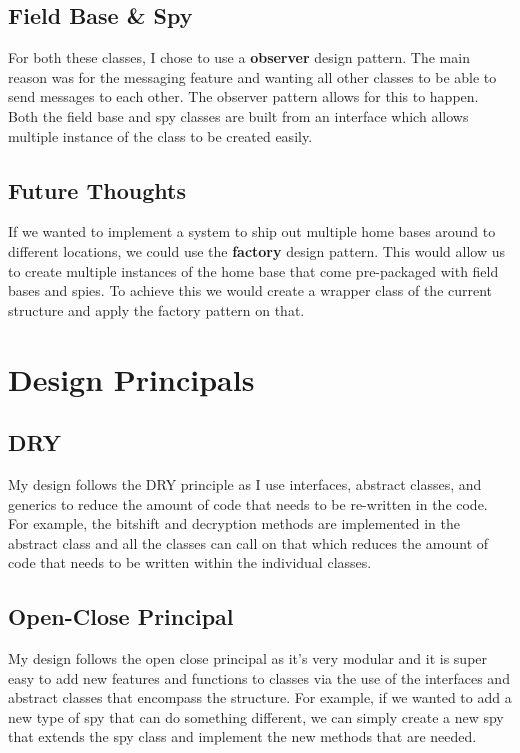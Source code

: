 \documentclass[12pt]{article}
\begin{document}
        \subsection*{Field Base \& Spy}
            For both these classes, I chose to use a \textbf{observer} design pattern. The main reason was for the messaging feature
            and wanting all other classes to be able to send messages to each other. The observer pattern allows
            for this to happen. Both the field base and spy classes are built from an interface which allows multiple instance
            of the class to be created easily. 

        \subsection*{Future Thoughts}
            If we wanted to implement a system to ship out multiple home bases around to different locations, we 
            could use the \textbf{factory} design pattern. This would allow us to create multiple 
            instances of the home base that come pre-packaged with field bases and spies. To achieve
            this we would create a wrapper class of the current structure and apply the factory pattern on that. 
    \section{Design Principals}
        \subsection*{DRY}
            My design follows the DRY principle as I use interfaces, abstract classes, and generics to reduce 
            the amount of code that needs to be re-written in the code. For example, the 
            bitshift and decryption methods are implemented in the abstract class and all the classes
            can call on that which reduces the amount of code that needs to be written within the individual classes. 
        \subsection*{Open-Close Principal}
            My design follows the open close principal as it's very modular and it is super easy to add new features 
            and functions to classes via the use of the interfaces and abstract classes that encompass the structure. 
            For example, if we wanted to add a new type of spy that can do something different, we can simply create a 
            new spy that extends the spy class and implement the new methods that are needed.
\end{document}
